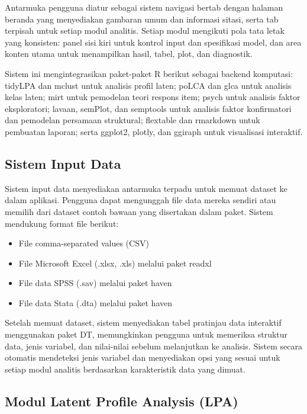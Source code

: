 \documentclass[12pt,a4paper]{article}
\begin{document}
Antarmuka pengguna diatur sebagai sistem navigasi bertab dengan halaman beranda yang menyediakan gambaran umum dan informasi sitasi, serta tab terpisah untuk setiap modul analitis. Setiap modul mengikuti pola tata letak yang konsisten: panel sisi kiri untuk kontrol input dan spesifikasi model, dan area konten utama untuk menampilkan hasil, tabel, plot, dan diagnostik.

Sistem ini mengintegrasikan paket-paket R berikut sebagai backend komputasi: tidyLPA dan mclust untuk analisis profil laten; poLCA dan glca untuk analisis kelas laten; mirt untuk pemodelan teori respons item; psych untuk analisis faktor eksploratori; lavaan, semPlot, dan semptools untuk analisis faktor konfirmatori dan pemodelan persamaan struktural; flextable dan rmarkdown untuk pembuatan laporan; serta ggplot2, plotly, dan ggiraph untuk visualisasi interaktif.

\subsection{Sistem Input Data}

Sistem input data menyediakan antarmuka terpadu untuk memuat dataset ke dalam aplikasi. Pengguna dapat mengunggah file data mereka sendiri atau memilih dari dataset contoh bawaan yang disertakan dalam paket. Sistem mendukung format file berikut:

\begin{itemize}[nosep, leftmargin=3em]
\item File comma-separated values (CSV)
\item File Microsoft Excel (.xlsx, .xls) melalui paket readxl
\item File data SPSS (.sav) melalui paket haven
\item File data Stata (.dta) melalui paket haven
\end{itemize}

Setelah memuat dataset, sistem menyediakan tabel pratinjau data interaktif menggunakan paket DT, memungkinkan pengguna untuk memeriksa struktur data, jenis variabel, dan nilai-nilai sebelum melanjutkan ke analisis. Sistem secara otomatis mendeteksi jenis variabel dan menyediakan opsi yang sesuai untuk setiap modul analitis berdasarkan karakteristik data yang dimuat.

\subsection{Modul Latent Profile Analysis (LPA)}
\end{document}
